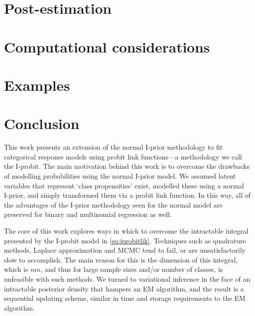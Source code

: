 \documentclass[showframe,11pt,twoside,openright]{report}
\begin{document}
\section{Post-estimation}\label{sec:iprobitpostest}


\section{Computational considerations}


\section{Examples}
\label{sec:iprobiteg}


\section{Conclusion}

This work presents an extension of the normal I-prior methodology to fit categorical response models using probit link functions---a methodology we call the I-probit.
The main motivation behind this work is to overcome the drawbacks of modelling probabilities using the normal I-prior model.
We assumed latent variables that represent `class propensities' exist, modelled these using a normal I-prior, and simply transformed them via a probit link function.
In this way, all of the advantages of the I-prior methodology seen for the normal model are preserved for binary and multinomial regression as well.

The core of this work explores ways in which to overcome the intractable integral presented by the I-probit model in \cref{eq:iprobitlik}.
Techniques such as quadrature methods, Laplace approximation and MCMC tend to fail, or are unsatisfactorily slow to accomplish.
The main reason for this is the dimension of this integral, which is $nm$, and thus for large sample sizes and/or number of classes, is unfeasible with such methods.
We turned to variational inference in the face of an intractable posterior density that hampers an EM algorithm, and the result is a sequential updating scheme, similar in time and storage requirements to the EM algorithm.
\end{document}
